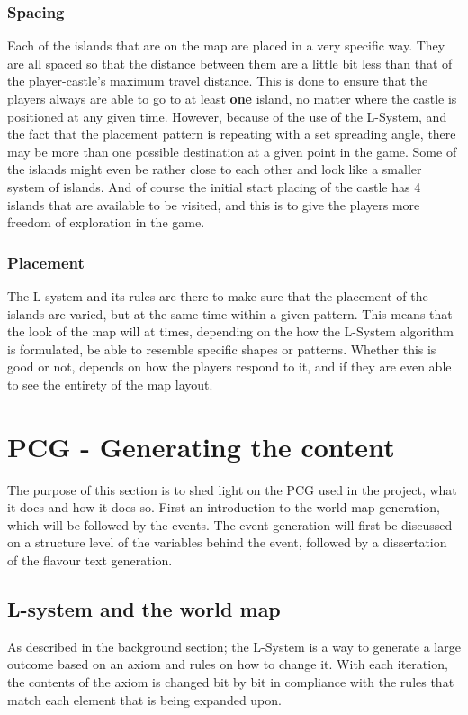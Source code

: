 \subsubsection{Spacing}
Each of the islands that are on the map are placed in a very specific way. They are all spaced so that the distance between them are a little bit less than that of the player-castle's maximum travel distance. This is done to ensure that the players always are able to go to at least \textbf{one} island, no matter where the castle is positioned at any given time. However, because of the use of the L-System, and the fact that the placement pattern is repeating with a set spreading angle, there may be more than one possible destination at a given point in the game. Some of the islands might even be rather close to each other and look like a smaller system of islands. And of course the initial start placing of the castle has 4 islands that are available to be visited, and this is to give the players more freedom of exploration in the game.

\subsubsection{Placement}
The L-system and its rules are there to make sure that the placement of the islands are varied, but at the same time within a given pattern. This means that the look of the map will at times, depending on the how the L-System algorithm is formulated, be able to resemble specific shapes or patterns. Whether this is good or not, depends on how the players respond to it, and if they are even able to see the entirety of the map layout.

\section{PCG - Generating the content}
The purpose of this section is to shed light on the PCG used in the project, what it does and how it does so. First an introduction to the world map generation, which will be followed by the events.
The event generation will first be discussed on a structure level of the variables behind the event, followed by a dissertation of the flavour text generation.

\subsection{L-system and the world map}
\label{sec:lsys}
As described in the background section; the L-System is a way to generate a large outcome based on an axiom and rules on how to change it. With each iteration, the contents of the axiom is changed bit by bit in compliance with the rules that match each element that is being expanded upon.


